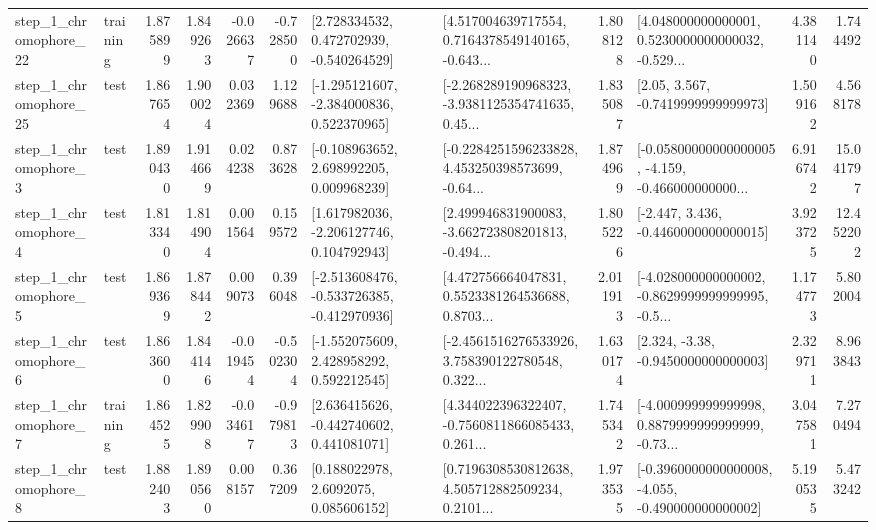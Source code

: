\begin{tabular}{llrrrrllrlrr}
    step\_1\_chromophore\_22 &  training &      1.875899 &    1.849263 &     -0.026637 & -0.728500 &    [2.728334532, 0.472702939, -0.540264529] &  [4.517004639717554, 0.7164378549140165, -0.643... &       1.808128 &  [4.048000000000001, 0.5230000000000032, -0.529... &            4.381140 &          1.744492 \\
    step\_1\_chromophore\_25 &      test &      1.867654 &    1.900024 &      0.032369 &  1.129688 &   [-1.295121607, -2.384000836, 0.522370965] &  [-2.268289190968323, -3.9381125354741635, 0.45... &       1.835087 &                 [2.05, 3.567, -0.7419999999999973] &            1.509162 &          4.568178 \\
     step\_1\_chromophore\_3 &      test &      1.890430 &    1.914669 &      0.024238 &  0.873628 &    [-0.108963652, 2.698992205, 0.009968239] &  [-0.2284251596233828, 4.453250398573699, -0.64... &       1.874969 &  [-0.05800000000000005, -4.159, -0.466000000000... &            6.916742 &         15.041797 \\
     step\_1\_chromophore\_4 &      test &      1.813340 &    1.814904 &      0.001564 &  0.159572 &    [1.617982036, -2.206127746, 0.104792943] &  [2.499946831900083, -3.662723808201813, -0.494... &       1.805226 &               [-2.447, 3.436, -0.4460000000000015] &            3.923725 &         12.452202 \\
     step\_1\_chromophore\_5 &      test &      1.869369 &    1.878442 &      0.009073 &  0.396048 &  [-2.513608476, -0.533726385, -0.412970936] &  [4.472756664047831, 0.5523381264536688, 0.8703... &       2.011913 &  [-4.028000000000002, -0.8629999999999995, -0.5... &            1.174773 &          5.802004 \\
     step\_1\_chromophore\_6 &      test &      1.863600 &    1.844146 &     -0.019454 & -0.502304 &    [-1.552075609, 2.428958292, 0.592212545] &  [-2.4561516276533926, 3.758390122780548, 0.322... &       1.630174 &                [2.324, -3.38, -0.9450000000000003] &            2.329711 &          8.963843 \\
     step\_1\_chromophore\_7 &  training &      1.864525 &    1.829908 &     -0.034617 & -0.979813 &    [2.636415626, -0.442740602, 0.441081071] &  [4.344022396322407, -0.7560811866085433, 0.261... &       1.745342 &  [-4.000999999999998, 0.8879999999999999, -0.73... &            3.047581 &          7.270494 \\
     step\_1\_chromophore\_8 &      test &      1.882403 &    1.890560 &      0.008157 &  0.367209 &       [0.188022978, 2.6092075, 0.085606152] &  [0.7196308530812638, 4.505712882509234, 0.2101... &       1.973535 &  [-0.3960000000000008, -4.055, -0.490000000000002] &            5.190535 &          5.473242 \\

\end{tabular}
